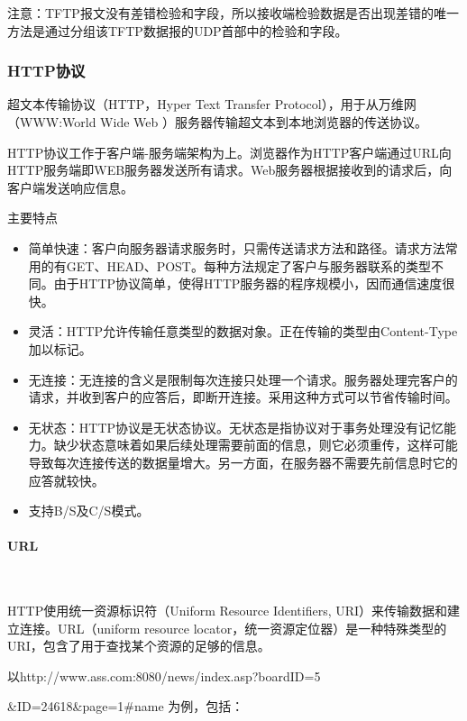 \documentclass[UTF8]{article}%
\begin{document}
注意：TFTP报文没有差错检验和字段，所以接收端检验数据是否出现差错的唯一方法是通过分组该TFTP数据报的UDP首部中的检验和字段。

\subsubsection{HTTP协议}

超文本传输协议（HTTP，Hyper Text Transfer Protocol），用于从万维网（WWW:World Wide Web ）服务器传输超文本到本地浏览器的传送协议。

HTTP协议工作于客户端-服务端架构为上。浏览器作为HTTP客户端通过URL向HTTP服务端即WEB服务器发送所有请求。Web服务器根据接收到的请求后，向客户端发送响应信息。

主要特点

\begin{itemize}
    \item 简单快速：客户向服务器请求服务时，只需传送请求方法和路径。请求方法常用的有GET、HEAD、POST。每种方法规定了客户与服务器联系的类型不同。由于HTTP协议简单，使得HTTP服务器的程序规模小，因而通信速度很快。
    \item 灵活：HTTP允许传输任意类型的数据对象。正在传输的类型由Content-Type加以标记。
    \item 无连接：无连接的含义是限制每次连接只处理一个请求。服务器处理完客户的请求，并收到客户的应答后，即断开连接。采用这种方式可以节省传输时间。
    \item 无状态：HTTP协议是无状态协议。无状态是指协议对于事务处理没有记忆能力。缺少状态意味着如果后续处理需要前面的信息，则它必须重传，这样可能导致每次连接传送的数据量增大。另一方面，在服务器不需要先前信息时它的应答就较快。
    \item 支持B/S及C/S模式。
\end{itemize}

\paragraph{URL}~{}

HTTP使用统一资源标识符（Uniform Resource Identifiers, URI）来传输数据和建立连接。URL（uniform resource locator，统一资源定位器）是一种特殊类型的URI，包含了用于查找某个资源的足够的信息。

以http://www.ass.com:8080/news/index.asp?boardID=5

\&ID=24618\&page=1\#name 为例，包括：
\end{document}
